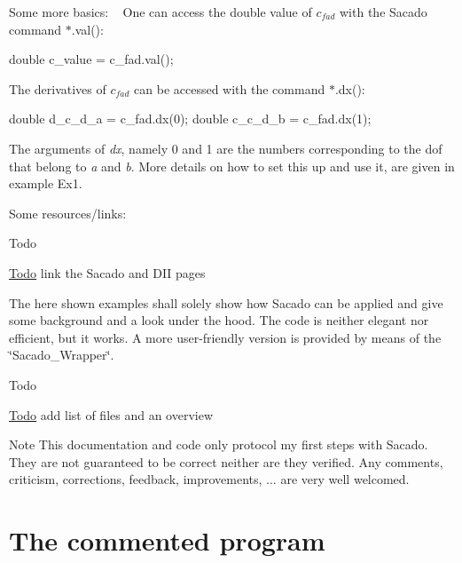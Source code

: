 Some more basics\+: ~\newline
One can access the double value of $ c_{fad} $ with the Sacado command $\ast$.val()\+: 
\begin{DoxyCode}
\textcolor{keywordtype}{double} c\_value = c\_fad.val();
\end{DoxyCode}
 The derivatives of $ c_{fad} $ can be accessed with the command $\ast$.dx()\+: 
\begin{DoxyCode}
\textcolor{keywordtype}{double} d\_c\_d\_a = c\_fad.dx(0);
\textcolor{keywordtype}{double} c\_c\_d\_b = c\_fad.dx(1);
\end{DoxyCode}
 The arguments of {\itshape dx}, namely 0 and 1 are the numbers corresponding to the dof that belong to {\itshape a} and {\itshape b}. More details on how to set this up and use it, are given in example Ex1.

Some resources/links\+: ~\newline
\begin{DoxyRefDesc}{Todo}
\item[\hyperlink{todo__todo000002}{Todo}]link the Sacado and D\+II pages\end{DoxyRefDesc}


The here shown examples shall solely show how Sacado can be applied and give some background and a look under the hood. The code is neither elegant nor efficient, but it works. A more user-\/friendly version is provided by means of the \char`\"{}\+Sacado\+\_\+\+Wrapper\char`\"{}. ~\newline
\begin{DoxyRefDesc}{Todo}
\item[\hyperlink{todo__todo000003}{Todo}]add list of files and an overview \end{DoxyRefDesc}


\begin{DoxyNote}{Note}
This documentation and code only protocol my first steps with Sacado. They are not guaranteed to be correct neither are they verified. Any comments, criticism, corrections, feedback, improvements, ... are very well welcomed.
\end{DoxyNote}
\hypertarget{index_code}{}\section{The commented program}\label{index_code}

